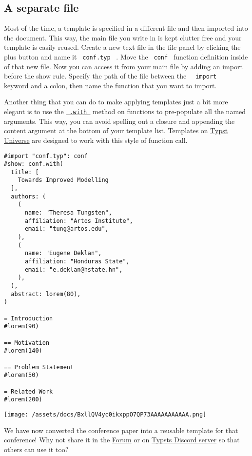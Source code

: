 \subsection{A separate file}\label{separate-file}

Most of the time, a template is specified in a different file and then
imported into the document. This way, the main file you write in is kept
clutter free and your template is easily reused. Create a new text file
in the file panel by clicking the plus button and name it
\texttt{\ conf.typ\ } . Move the \texttt{\ conf\ } function definition
inside of that new file. Now you can access it from your main file by
adding an import before the show rule. Specify the path of the file
between the \texttt{\ }{\texttt{\ import\ }}\texttt{\ } keyword and a
colon, then name the function that you want to import.

Another thing that you can do to make applying templates just a bit more
elegant is to use the
\href{/docs/reference/foundations/function/\#definitions-with}{\texttt{\ .with\ }}
method on functions to pre-populate all the named arguments. This way,
you can avoid spelling out a closure and appending the content argument
at the bottom of your template list. Templates on
\href{https://typst.app/universe/}{Typst Universe} are designed to work
with this style of function call.

\begin{verbatim}
#import "conf.typ": conf
#show: conf.with(
  title: [
    Towards Improved Modelling
  ],
  authors: (
    (
      name: "Theresa Tungsten",
      affiliation: "Artos Institute",
      email: "tung@artos.edu",
    ),
    (
      name: "Eugene Deklan",
      affiliation: "Honduras State",
      email: "e.deklan@hstate.hn",
    ),
  ),
  abstract: lorem(80),
)

= Introduction
#lorem(90)

== Motivation
#lorem(140)

== Problem Statement
#lorem(50)

= Related Work
#lorem(200)
\end{verbatim}

\texttt{[image: /assets/docs/BxllQV4yc0ikxppO7QP73AAAAAAAAAAA.png]}

We have now converted the conference paper into a reusable template for
that conference! Why not share it in the
\href{https://forum.typst.app/}{Forum} or on
\href{https://discord.gg/2uDybryKPe}{Typst\textquotesingle s Discord
server} so that others can use it too?


